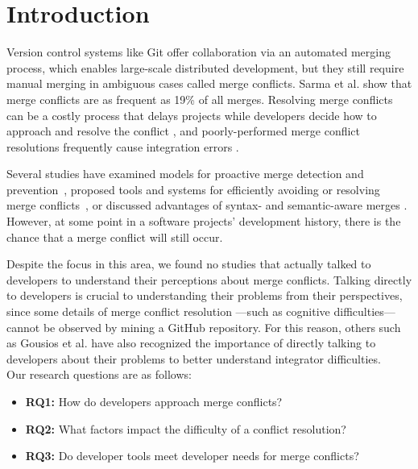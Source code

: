 \section{Introduction}\label{introduction}


Version control systems like Git offer collaboration via an automated merging process, which enables large-scale distributed development, but they still require manual merging in ambiguous cases called merge conflicts. Sarma et al. \cite{cassandra} show that merge conflicts are as frequent as 19\% of all merges. Resolving merge conflicts can be a costly process that delays projects while developers decide how to approach and resolve the conflict \cite{cassandra}, and poorly-performed merge conflict resolutions frequently cause integration errors \cite{bird-branches-conflict}.


Several studies have examined models for proactive merge detection and prevention~\cite{Brun2011}\cite{palantir}\cite{Guimaraes}, proposed tools and systems for efficiently avoiding or resolving merge conflicts~\cite{nishimura}\cite{mens2002state}, or discussed advantages of syntax- and semantic-aware merges \cite{danny_refactorings}\cite{hunt2002extensible}. However, at some point in a software projects' development history, there is the chance that a merge conflict will still occur. 


Despite the focus in this area, we found no studies that actually talked to developers to understand their perceptions about merge conflicts. Talking directly to developers is crucial to understanding their problems from their perspectives, since some details of merge conflict resolution ---such as cognitive difficulties--- cannot be observed by mining a GitHub repository. For this reason, others such as Gousios et al. \cite{integrator_perspective} have also recognized the importance of directly talking to developers about their problems to better understand integrator difficulties.\\

Our research questions are as follows:
\begin{itemize}
\item\textbf{RQ1:} How do developers approach merge conflicts?\\
\item\textbf{RQ2:} What factors impact the difficulty of a conflict resolution?\\
\item\textbf{RQ3:} Do developer tools meet developer needs for merge conflicts?\\
\end{itemize}

